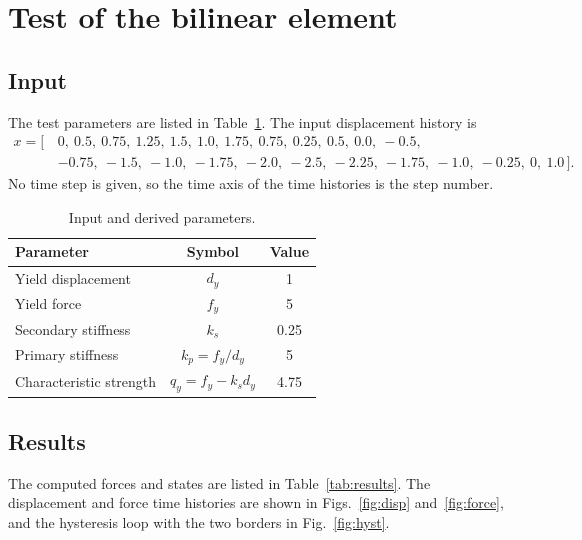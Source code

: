 \documentclass[11pt,a4paper]{article}
\begin{document}
\section{Test of the bilinear element}
\subsection{Input}
The test parameters are listed in Table~\ref{tab:param}. The input displacement history is
\begin{align*}
x = [\,&0,\ 0.5,\ 0.75,\ 1.25,\ 1.5,\ 1.0,\ 1.75,\ 0.75,\ 0.25,\ 0.5,\ 0.0,\ -0.5,\\
       &-0.75,\ -1.5,\ -1.0,\ -1.75,\ -2.0,\ -2.5,\ -2.25,\ -1.75,\ -1.0,\ -0.25,\ 0,\ 1.0\,].
\end{align*}
No time step is given, so the time axis of the time histories is the step number.

\begin{table}[H]
\centering
\caption{Input and derived parameters.}
\label{tab:param}
\begin{tabular}{lcc}
\toprule
Parameter & Symbol & Value\\
\midrule
Yield displacement      & $d_y$ & 1\\
Yield force             & $f_y$ & 5\\
Secondary stiffness     & $k_s$ & 0.25\\
\midrule
Primary stiffness       & $k_p = f_y/d_y$       & 5\\
Characteristic strength & $q_y = f_y - k_s d_y$ & 4.75\\
\bottomrule
\end{tabular}
\end{table}

\subsection{Results}
The computed forces and states are listed in Table~\ref{tab:results}. The displacement and force
time histories are shown in Figs.~\ref{fig:disp} and~\ref{fig:force}, and the hysteresis loop
with the two borders in Fig.~\ref{fig:hyst}.
\end{document}

